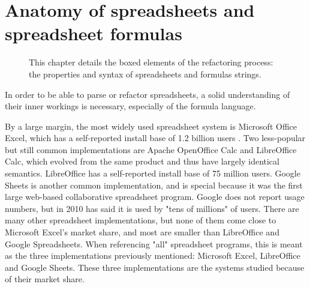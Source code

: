 
\chapter{Anatomy of spreadsheets and spreadsheet formulas}
\label{chapter:anatomy}

\noindent
\begin{figure}[h]
\centerfloat

\caption{This chapter details the boxed elements of the refactoring process: the properties and syntax of spreadsheets and formulas strings.}
\end{figure}

In order to be able to parse or refactor spreadsheets, a solid understanding of their inner workings is necessary, especially of the formula language.

By a large margin, the most widely used spreadsheet system is Microsoft Office Excel, which has a self-reported install base of 1.2 billion users \cite{microsoftByTheNumbers}.
Two less-popular but still common implementations are Apache OpenOffice Calc and LibreOffice Calc, which evolved from the same product and thus have largely identical semantics.
LibreOffice has a self-reported install base of 75 million users.
Google Sheets is another common implementation, and is special because it was the first large web-based collaborative spreadsheet program.
Google does not report usage numbers, but in 2010 has said it is used by "tens of millions" of users.
There are many other spreadsheet implementations, but none of them come close to Microsoft Excel's market share, and most are smaller than LibreOffice and Google Spreadsheets.
When referencing "all" spreadsheet programs, this is meant as the three implementations previously mentioned: Microsoft Excel, LibreOffice and Google Sheets.
These three implementations are the systems studied because of their market share.

\newpage

